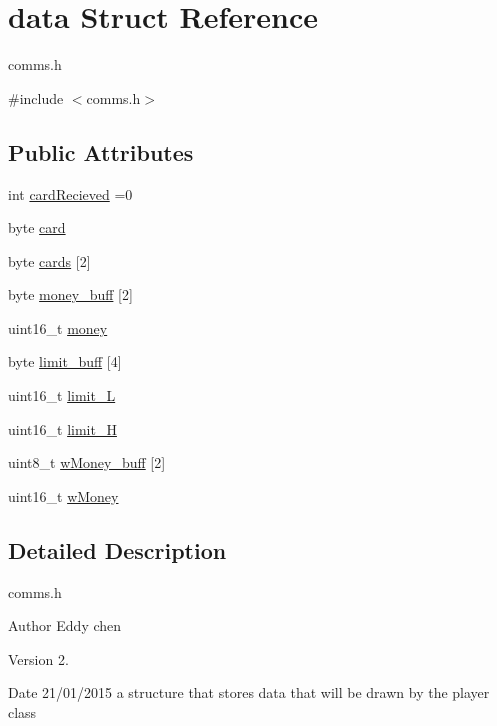 \hypertarget{structdata}{\section{data Struct Reference}
\label{structdata}
}


comms.\-h  




{\ttfamily \#include $<$comms.\-h$>$}

\subsection*{Public Attributes}
\begin{DoxyCompactItemize}
\item 
int \hyperlink{structdata_a0ecb26db821291cbb69870db48fda7e7}{card\-Recieved} =0
\item 
byte \hyperlink{structdata_a9edceaacf417a932755881a26f3981b3}{card}
\item 
byte \hyperlink{structdata_aa95adf1d54211611b8859f396e5461c8}{cards} \mbox{[}2\mbox{]}
\item 
byte \hyperlink{structdata_a291fb2462324a08de344cedeaa5d2e6c}{money\-\_\-buff} \mbox{[}2\mbox{]}
\item 
uint16\-\_\-t \hyperlink{structdata_ad772ea43ec2d839008e9489b66b58c2b}{money}
\item 
byte \hyperlink{structdata_abffea4ce3d58957118e798021b20d21b}{limit\-\_\-buff} \mbox{[}4\mbox{]}
\item 
uint16\-\_\-t \hyperlink{structdata_a0327d80cf72b681340d6a327722e2ea9}{limit\-\_\-\-L}
\item 
uint16\-\_\-t \hyperlink{structdata_ad116e504386d48fc50d7fb1706fba7ed}{limit\-\_\-\-H}
\item 
uint8\-\_\-t \hyperlink{structdata_ae14f0bfec778527ea0bb3dc5259a2b35}{w\-Money\-\_\-buff} \mbox{[}2\mbox{]}
\item 
uint16\-\_\-t \hyperlink{structdata_a458601a4ec019baa22d16beb457f99bd}{w\-Money}
\end{DoxyCompactItemize}


\subsection{Detailed Description}
comms.\-h 

\begin{DoxyAuthor}{Author}
Eddy chen 
\end{DoxyAuthor}
\begin{DoxyVersion}{Version}
2. 
\end{DoxyVersion}
\begin{DoxyDate}{Date}
21/01/2015 a structure that stores data that will be drawn by the player class 
\end{DoxyDate}


